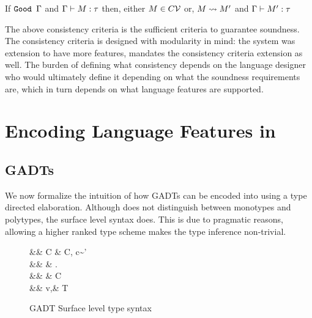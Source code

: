 \documentclass[manuscript,screen,nonacm]{acmart}
\begin{document}
\begin{theorem}\label{thm:progress-sfc}
 If $\texttt{Good~}\Gamma$ and $\Gamma \vdash M : \tau$ then, either $M \in C\mathcal{V}$ or, $M \rightsquigarrow M'$ and
 $\Gamma \vdash M' : \tau$
\end{theorem}

The above consistency criteria is the sufficient criteria to guarantee soundness. The consistency criteria is designed with modularity in mind: the system was extension to have more features, mandates the consistency criteria extension as well. The burden of defining what consistency depends on the language designer who would ultimately define it depending on what the soundness requirements are, which in turn depends on what language features are supported.

\section{Encoding Language Features in \SFC}\label{sec:sfc-encoding-features}%
\subsection{GADTs}\label{sec:fc-encodes-gadts}
We now formalize the intuition of how GADTs can be encoded into \SFC using a type directed elaboration. Although \SFC does not distinguish between monotypes and polytypes, the surface level syntax does. This is due to pragmatic reasons, allowing a higher ranked type scheme makes the type inference non-trivial\cite{jones_practical_2007}.

\begin{figure}[ht]
 \centering
 \begin{syntax}
  && C \bnfeq& \empt \bnfor C, c\co\tau\sim\tau'\\
  && \pi \bnfeq& \eta \bnfor \Forall\TyVar.\pi\\
  && \eta \bnfeq& \tau \bnfor C \then \eta\\
  && v,\tau \bnfeq& \TyVar \bnfor \tau\to\tau \bnfor T\App\many\tau
 \end{syntax}
 \caption{GADT Surface level type syntax}
 \label{fig:gadt-type-syntax}
\end{figure}
\end{document}
